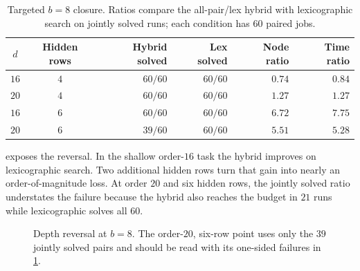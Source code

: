 \documentclass[10pt,twoside]{article}
\theoremstyle{noteplain}
\theoremstyle{definition}
\begin{document}
\begin{table}[H]
\centering
\caption{Targeted $b=8$ closure.  Ratios compare the all-pair/lex hybrid with lexicographic search on jointly solved runs; each condition has $60$ paired jobs.}
\label{tab:closure}
\small
\begin{tabular}{@{}ccrrrr@{}}
\toprule
$d$ & Hidden rows & Hybrid solved & Lex solved & Node ratio & Time ratio \\
\midrule
$16$ & $4$ & $60/60$ & $60/60$ & $0.74$ & $0.84$ \\
$20$ & $4$ & $60/60$ & $60/60$ & $1.27$ & $1.27$ \\
$16$ & $6$ & $60/60$ & $60/60$ & $6.72$ & $7.75$ \\
$20$ & $6$ & $39/60$ & $60/60$ & $5.51$ & $5.28$ \\
\bottomrule
\end{tabular}
\end{table}

 exposes the reversal.  In the shallow order-$16$ task the hybrid improves on lexicographic search.  Two additional hidden rows turn that gain into nearly an order-of-magnitude loss.  At order $20$ and six hidden rows, the jointly solved ratio understates the failure because the hybrid also reaches the budget in $21$ runs while lexicographic solves all $60$.

\begin{figure}[H]
\centering
{}
\caption{Depth reversal at $b=8$.  The order-$20$, six-row point uses only the $39$ jointly solved pairs and should be read with its one-sided failures in \cref{tab:closure}.}
\label{fig:reversal}
\end{figure}
\end{document}
